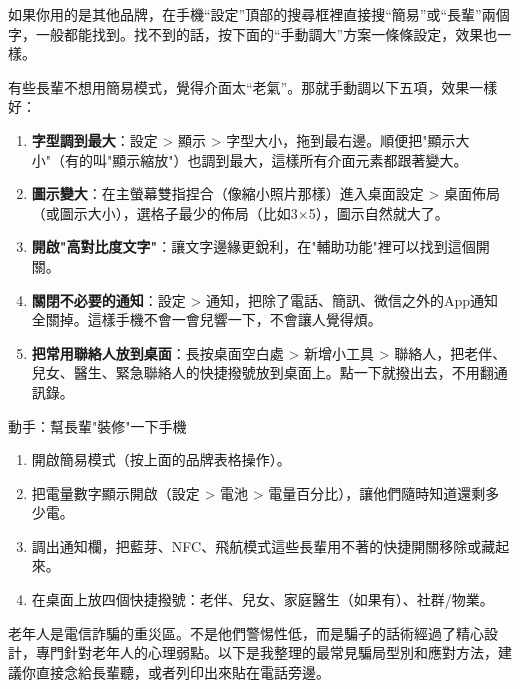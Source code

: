 如果你用的是其他品牌，在手機“設定”頂部的搜尋框裡直接搜“簡易”或“長輩”兩個字，一般都能找到。找不到的話，按下面的“手動調大”方案一條條設定，效果也一樣。


有些長輩不想用簡易模式，覺得介面太“老氣”。那就手動調以下五項，效果一樣好：

\begin{enumerate}
  \item \textbf{字型調到最大}：設定 > 顯示 > 字型大小，拖到最右邊。順便把"顯示大小"（有的叫"顯示縮放"）也調到最大，這樣所有介面元素都跟著變大。
  \item \textbf{圖示變大}：在主螢幕雙指捏合（像縮小照片那樣）進入桌面設定 > 桌面佈局（或圖示大小），選格子最少的佈局（比如3×5），圖示自然就大了。
  \item \textbf{開啟"高對比度文字"}：讓文字邊緣更銳利，在"輔助功能"裡可以找到這個開關。
  \item \textbf{關閉不必要的通知}：設定 > 通知，把除了電話、簡訊、微信之外的App通知全關掉。這樣手機不會一會兒響一下，不會讓人覺得煩。
  \item \textbf{把常用聯絡人放到桌面}：長按桌面空白處 > 新增小工具 > 聯絡人，把老伴、兒女、醫生、緊急聯絡人的快捷撥號放到桌面上。點一下就撥出去，不用翻通訊錄。
\end{enumerate}

\begin{tcbpractice}{動手：幫長輩"裝修"一下手機}
\begin{enumerate}
  \item 開啟簡易模式（按上面的品牌表格操作）。
  \item 把電量數字顯示開啟（設定 > 電池 > 電量百分比），讓他們隨時知道還剩多少電。
  \item 調出通知欄，把藍芽、NFC、飛航模式這些長輩用不著的快捷開關移除或藏起來。
  \item 在桌面上放四個快捷撥號：老伴、兒女、家庭醫生（如果有）、社群/物業。
\end{enumerate}

\end{tcbpractice}


老年人是電信詐騙的重災區。不是他們警惕性低，而是騙子的話術經過了精心設計，專門針對老年人的心理弱點。以下是我整理的最常見騙局型別和應對方法，建議你直接念給長輩聽，或者列印出來貼在電話旁邊。



